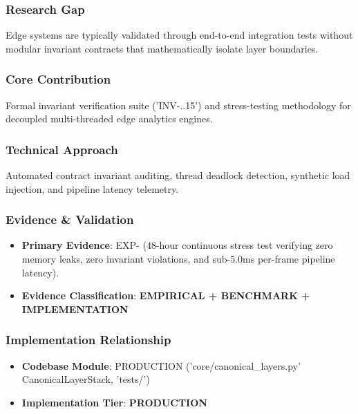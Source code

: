\documentclass[11pt,letterpaper]{article}
\begin{document}
\subsubsection{Research Gap}
Edge systems are typically validated through end-\allowbreak to-\allowbreak end integration tests without modular invariant contracts that mathematically isolate layer boundaries.

\subsubsection{Core Contribution}
Formal invariant verification suite ('INV-..15') and stress-\allowbreak testing methodology for decoupled multi-\allowbreak threaded edge analytics engines.

\subsubsection{Technical Approach}
Automated contract invariant auditing, thread deadlock detection, synthetic load injection, and pipeline latency telemetry.

\subsubsection{Evidence \& Validation}
\begin{itemize}[leftmargin=*]
    \item \textbf{Primary Evidence}: EXP- (48-\allowbreak hour continuous stress test verifying zero memory leaks, zero invariant violations, and sub-\allowbreak 5.0ms per-\allowbreak frame pipeline latency).
    \item \textbf{Evidence Classification}: \textbf{EMPIRICAL + BENCHMARK + IMPLEMENTATION}
\end{itemize}

\subsubsection{Implementation Relationship}
\begin{itemize}[leftmargin=*]
    \item \raggedright \textbf{Codebase Module}: PRODUCTION ('core/\allowbreak canonical\_\allowbreak layers.py' CanonicalLayerStack, 'tests/\allowbreak ')
    \item \textbf{Implementation Tier}: \textbf{PRODUCTION}
\end{itemize}
\end{document}

